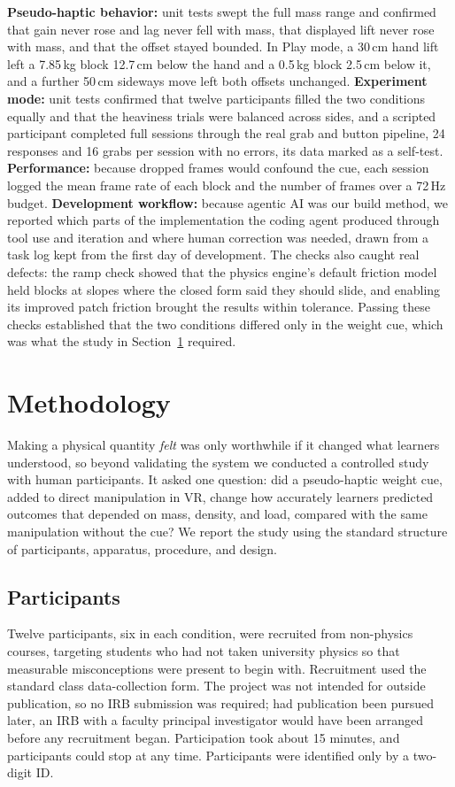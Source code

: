 \documentclass[sigconf,nonacm]{acmart}
\begin{document}
\textbf{Pseudo-haptic behavior:} unit tests swept the full mass range and confirmed that
gain never rose and lag never fell with mass, that displayed lift never rose with mass,
and that the offset stayed bounded. In Play mode, a 30\,cm hand lift left a 7.85\,kg
block 12.7\,cm below the hand and a 0.5\,kg block 2.5\,cm below it, and a further 50\,cm
sideways move left both offsets unchanged. \textbf{Experiment mode:} unit tests confirmed that twelve
participants filled the two conditions equally and that the heaviness trials were balanced
across sides, and a scripted participant completed full sessions through the real grab
and button pipeline, 24 responses and 16 grabs per session with no errors, its data marked
as a self-test. \textbf{Performance:} because
dropped frames would confound the cue, each session logged the mean frame rate of each
block and the number of frames over a 72\,Hz budget.
\textbf{Development workflow:} because agentic AI was our build method, we reported which
parts of the implementation the coding agent produced through tool use and iteration and
where human correction was needed, drawn from a task log kept from the first day of
development. The checks also caught real defects: the ramp check showed that the physics
engine's default friction model held blocks at slopes where the closed form said they
should slide, and enabling its improved patch friction brought the results within
tolerance. Passing these checks established that the two conditions differed only in the
weight cue, which was what the study in Section~\ref{sec:methodology} required.

\section{Methodology}
\label{sec:methodology}
Making a physical quantity \emph{felt} was only worthwhile if it changed what learners
understood, so beyond validating the system we conducted a controlled study with human
participants. It asked one question: did a pseudo-haptic weight cue, added to direct
manipulation in VR, change how accurately learners predicted outcomes that depended on
mass, density, and load, compared with the same manipulation without the cue? We report
the study using the standard structure of participants, apparatus, procedure, and design.

\subsection{Participants}
Twelve participants, six in each condition, were recruited
from non-physics courses, targeting students who had not taken university physics so
that measurable misconceptions were present to begin with. Recruitment used the standard
class data-collection form. The project was not intended for outside publication, so no
IRB submission was required; had publication been pursued later, an IRB with a faculty
principal investigator would have been arranged before any recruitment began.
Participation took about 15 minutes, and participants could stop at any time. Participants
were identified only by a two-digit ID.
\end{document}
